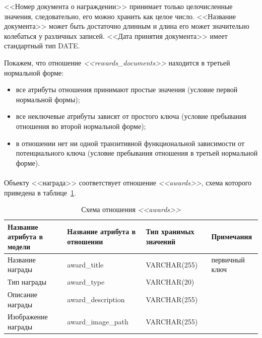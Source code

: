 <<Номер документа о награждении>> принимает только целочисленные значения, следовательно, его можно хранить как 
целое число. <<Название документа>> может быть достаточно длинным и длина его может значительно колебаться
у различных записей. <<Дата принятия документа>> имеет стандартный тип DATE.

Покажем, что отношение \textit{<<rewards\_documents>>} находится в третьей нормальной форме:
\begin{itemize}
\item
все атрибуты отношения принимают простые значения
(условие первой нормальной формы);
\item
все неключевые атрибуты зависят от простого ключа
(условие пребывания отношения во второй нормальной форме);
\item
в отношении нет ни одной транзитивной функциональной зависимости от потенциального ключа
(условие пребывания отношения в третьей нормальной форме).
\end{itemize}

\paragraph{}
Объекту <<награда>> соответствует отношение \textit{<<awards>>},
схема которого приведена в таблице~\ref{tbl:awards_scheme}.

\begin{table}[h!]
  \caption{Схема отношения \textit{<<awards>>}}
  \label{tbl:awards_scheme}
  \small{
    \centering
    \begin{tabular}{| p{} | p{} | p{} | p{} |}
      \hline
      Название атрибута \newline в модели &
      Название атрибута \newline в отношении &
      Тип хранимых \newline значений &
      Примечания \\ \hline

      Название награды &
      award\_title &
      VARCHAR(255) &
      первичный ключ \\
      \hline

      Тип награды &
      award\_type &
      VARCHAR(20) & \\
      \hline

      Описание награды &
      award\_description &
      VARCHAR(255) & \\
      \hline

      Изображение награды &
      award\_image\_path &
      VARCHAR(255) & \\
      \hline
    \end{tabular}
  }
\end{table}

